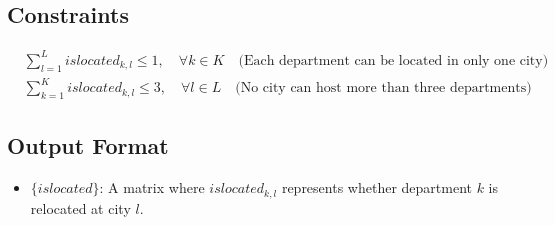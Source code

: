 \documentclass{article}
\begin{document}
\subsection*{Constraints}
\begin{align*}
& \sum_{l=1}^{L} islocated_{k, l} \leq 1, \quad \forall k \in K \quad \text{(Each department can be located in only one city)} \\
& \sum_{k=1}^{K} islocated_{k, l} \leq 3, \quad \forall l \in L \quad \text{(No city can host more than three departments)}
\end{align*}

\subsection*{Output Format}
\begin{itemize}
    \item $\{ islocated \}$: A matrix where $islocated_{k, l}$ represents whether department $k$ is relocated at city $l$.
\end{itemize}
\end{document}
